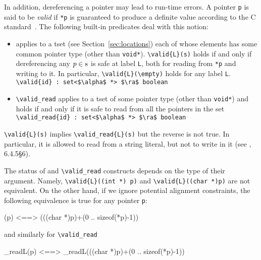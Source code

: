 In addition, dereferencing a pointer may lead to run-time errors. A pointer
\lstinline|p| is said to be \emph{valid} if \lstinline|*p| is guaranteed to
produce a definite value according to the C standard~\cite{standardc99}. The
following built-in predicates deal with this notion:
\begin{itemize}
\item \valid{} applies to a tset  
(see Section~\ref{sec:locations}) each of whose elements has some common pointer type (other than \lstinline|void*|). 
\lstinline|\valid{L}(s)| holds if and only if
 dereferencing any $p\in \lstinline|s|$ is safe  at label \lstinline|L|, both for reading from 
\lstinline|*p| and writing to it. In particular,
\lstinline|\valid{L}(\empty)| holds for any label \lstinline|L|. 
\\ \makebox[5mm]{} \lstinline|\valid{id} : set<$\alpha$ *> $\ra$ boolean|
\item 
\lstinline|\valid_read|
applies to a tset of some pointer type (other than \lstinline|void*|)
and holds if and only if it is safe to read from all the pointers in the set
\\ \makebox[5mm]{} \lstinline|\valid_read{id} : set<$\alpha$ *> $\ra$ boolean|
\end{itemize}

\lstinline|\valid{L}(s)| implies \lstinline|\valid_read{L}(s)| but the reverse is 
not true. In particular, it is allowed to read from a string literal, but not 
to write in it (see \cite{standardc99}, 6.4.5\S6).

The status of \valid and \lstinline|\valid_read| constructs depends on the
type of their argument. Namely, \lstinline|\valid{L}((int *) p)| and 
\lstinline|\valid{L}((char *)p)| are not equivalent. On the other hand, if we 
ignore potential alignment constraints, the following equivalence is true for any pointer \lstinline|p|:
\begin{listing-nonumber}
(p) <==> (((char *)p)+(0 .. sizeof(*p)-1))
\end{listing-nonumber}
and similarly for \lstinline|\valid_read|
\begin{listing-nonumber}
\valid_read{L}(p) <==> \valid_read{L}(((char *)p)+(0 .. sizeof(*p)-1))
\end{listing-nonumber}

